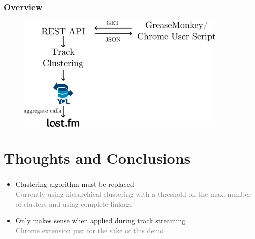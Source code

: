 \documentclass[slidestop,compress,mathserif,serif,notes=show]{beamer}
\begin{document}
  
  \begin{frame}
    \frametitle{Overview}
    \vspace{0.5cm}
    \begin{figure}
      \centering 
      \includegraphics[width=0.9\textwidth]{figs/diagram.pdf} 
      \label{fig:diagram} 
    \end{figure}
  \end{frame}


  \section{Thoughts and Conclusions}
  \begin{frame}
    \frametitle{\secname{}}
    \vspace{1cm}
    \begin{itemize}
      \item{}
      Clustering algorithm must be replaced\\
      \textcolor{gray}{Currently using hierarchical clustering with a threshold on the
      max. number of clusters and using complete linkage}
      \item{}
      Only makes sense when applied during track streaming\\
      \textcolor{gray}{Chrome extension just for the sake of this demo}
    \end{itemize}
  \end{frame}
\end{document}
